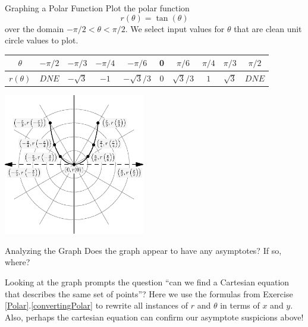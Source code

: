 \begin{example}{Graphing a Polar Function}
Plot the polar function $$r(\theta)=\tan(\theta) $$ over the domain $-\pi/2<\theta < \pi/2$.  We select input values for $\theta$ that are clean unit circle values to plot.
\begin{center}
\begin{tabular}{|c||c|c|c|c|c|c|c|c|c|} \hline
$\theta$ & $ -\pi/2$ &$ -\pi/3$ &$ -\pi/4$  &$-\pi/6$ & 0 & $\pi/6$ & $\pi/4$ &$\pi/3$ &$\pi/2$ \\ \hline
$r(\theta)$ & $ DNE $ &$ -\sqrt{3}$ &$ -1$  &$-\sqrt{3}/3$ & 0 & $\sqrt{3}/3 $ & $1$ &$\sqrt{3}$ &$DNE$ \\ \hline
\end{tabular}
\end{center}

	\begin{center}
		\includegraphics[width=175pt]{ChapterCalcIII/Figures/tanpolar.eps}
	\end{center}
\end{example}

\begin{exercise}{Analyzing the Graph  \Coffeecup \Coffeecup}
Does the graph appear to have any asymptotes?  If so, where?
\vspace*{.5in}
\end{exercise}

Looking at the graph prompts the question ``can we find a Cartesian equation that describes the same set of points''?  Here we use the formulas from Exercise \ref{Polar}.\ref{convertingPolar} to rewrite all instances of $r$ and $\theta$ in terms of $x$ and $y$.  Also, perhaps the cartesian equation can confirm our asymptote suspicions above!

